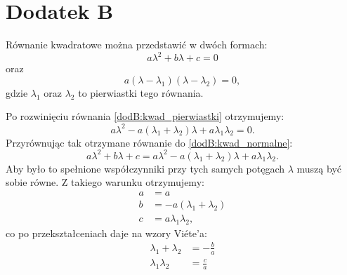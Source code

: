 \documentclass[10pt, a4paper, twoside, onecolumn]{article}
\numberwithin{equation}{section}
\begin{document}
	\section*{Dodatek B}\label{sec: dodatek B}
	Równanie kwadratowe można przedstawić w dwóch formach:
	\begin{equation}\label{dodB:kwad_normalne}
		a\lambda^{2} + b\lambda + c = 0
	\end{equation}
	oraz
	\begin{equation}\label{dodB:kwad_pierwiastki}
		a(\lambda - \lambda_{1})(\lambda - \lambda_{2}) = 0,
	\end{equation}
	gdzie \(\lambda_{1}\) oraz \(\lambda_{2}\) to pierwiastki tego równania. \par
	Po rozwinięciu równania \eqref{dodB:kwad_pierwiastki} otrzymujemy: 
	\begin{equation}
		a\lambda^{2} - a(\lambda_{1} + \lambda_{2})\lambda + a\lambda_{1}\lambda_{2} = 0.
	\end{equation}
	Przyrównując tak otrzymane równanie do \eqref{dodB:kwad_normalne}: 
	\begin{equation}
		a\lambda^{2} + b\lambda + c = a\lambda^{2} - a(\lambda_{1} + \lambda_{2})\lambda + a\lambda_{1}\lambda_{2}.
	\end{equation}
	Aby było to spełnione współczynniki przy tych samych potęgach \(\lambda\) muszą być sobie równe. Z takiego warunku otrzymujemy:
	\begin{equation}
	\begin{split}
		a &= a \\
		b &= - a(\lambda_{1} + \lambda_{2}) \\
		c &= a\lambda_{1}\lambda_{2},
	\end{split}
	\end{equation}
	co po przekształceniach daje na wzory Vi\'{e}te'a:
	\begin{equation}
	\begin{split}
		\lambda_{1} + \lambda_{2} &= -\frac{b}{a} \\
		\lambda_{1}\lambda_{2} &= \frac{c}{a}
	\end{split}
	\end{equation}
\end{document}
